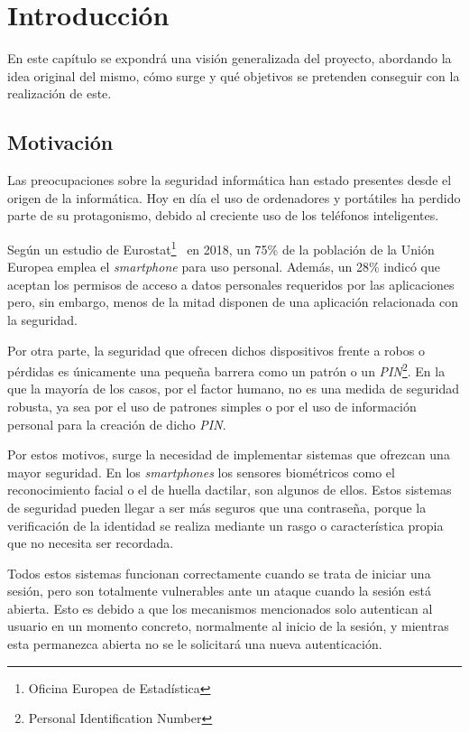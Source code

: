 \chapter{Introducción}
\label{chap:introducion}

En este capítulo se expondrá una visión generalizada del proyecto, abordando la idea original del mismo, cómo surge y qué objetivos se pretenden conseguir con la realización de este.

\section{Motivación}
Las preocupaciones sobre la seguridad informática han estado presentes desde el origen de la informática. Hoy en día el uso de ordenadores y portátiles ha perdido parte de su protagonismo, debido al creciente uso de los  teléfonos inteligentes.

Según un estudio de Eurostat\footnote{Oficina Europea de Estadística}~\cite{eurostat} en 2018, un 75\% de la población de la Unión Europea emplea el \textit{smartphone} para uso personal. Además, un 28\% indicó que aceptan los permisos de acceso a datos personales requeridos por las aplicaciones pero, sin embargo, menos de la mitad disponen de una aplicación relacionada con la seguridad.

Por otra parte, la seguridad que ofrecen dichos dispositivos frente a robos o pérdidas es únicamente una pequeña barrera como un patrón o un \textit{PIN}\footnote{Personal Identification Number}. En la que la mayoría de los casos, por el factor humano, no es una medida de seguridad robusta, ya sea por el uso de patrones simples o por el uso de información personal para la creación de dicho \textit{PIN}.

Por estos motivos, surge la necesidad de implementar sistemas que ofrezcan una mayor seguridad. En los \textit{smartphones} los sensores biométricos como el reconocimiento facial o el de huella dactilar, son algunos de ellos. Estos sistemas de seguridad pueden llegar a ser más seguros que una contraseña, porque la verificación de la identidad se realiza mediante un rasgo o característica propia que no necesita ser recordada.

Todos estos sistemas funcionan correctamente cuando se trata de iniciar una sesión, pero son totalmente vulnerables ante un ataque cuando la sesión está abierta. Esto es debido a que los mecanismos mencionados solo autentican al usuario en un momento concreto, normalmente al inicio de la sesión, y mientras esta permanezca abierta no se le solicitará una nueva autenticación.
 
